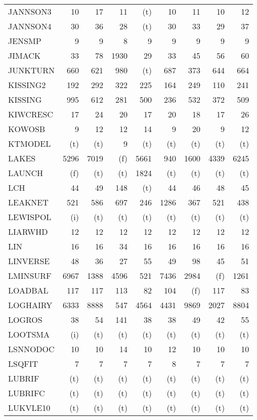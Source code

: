 \documentclass[11pt,twoside]{article}
\begin{document}
{\begin{longtable}[c]{|l|r|r|r|r|r|r|r|r|}
 JANNSON3 & 10 & 17 & 11 & (t) & 10 & 11 & 10 & 12 \\
 JANNSON4 & 30 & 36 & 28 & (t) & 30 & 33 & 29 & 37 \\
 JENSMP & 9 & 9 & 8 & 9 & 9 & 9 & 9 & 9 \\
 JIMACK & 33 & 78 & 1930 & 29 & 33 & 45 & 56 & 60 \\
 JUNKTURN & 660 & 621 & 980 & (t) & 687 & 373 & 644 & 664 \\
 KISSING2 & 192 & 292 & 322 & 225 & 164 & 249 & 110 & 241 \\
 KISSING & 995 & 612 & 281 & 500 & 236 & 532 & 372 & 509 \\
 KIWCRESC & 17 & 24 & 20 & 17 & 20 & 18 & 17 & 26 \\
 KOWOSB & 9 & 12 & 12 & 14 & 9 & 20 & 9 & 12 \\
 KTMODEL & (t) & (t) & 9 & (t) & (t) & (t) & (t) & (t) \\
 LAKES & 5296 & 7019 & (f) & 5661 & 940 & 1600 & 4339 & 6245 \\
 LAUNCH & (f) & (t) & (t) & 1824 & (t) & (t) & (t) & (t) \\
 LCH & 44 & 49 & 148 & (t) & 44 & 46 & 48 & 45 \\
 LEAKNET & 521 & 586 & 697 & 246 & 1286 & 367 & 521 & 438 \\
 LEWISPOL & (i) & (t) & (t) & (t) & (t) & (t) & (t) & (t) \\
 LIARWHD & 12 & 12 & 12 & 12 & 12 & 12 & 12 & 12 \\
 LIN & 16 & 16 & 34 & 16 & 16 & 16 & 16 & 16 \\
 LINVERSE & 48 & 36 & 27 & 55 & 49 & 98 & 45 & 51 \\
 LMINSURF & 6967 & 1388 & 4596 & 521 & 7436 & 2984 & (f) & 1261 \\
 LOADBAL & 117 & 117 & 113 & 82 & 104 & (f) & 117 & 83 \\
 LOGHAIRY & 6333 & 8888 & 547 & 4564 & 4431 & 9869 & 2027 & 8804 \\
 LOGROS & 38 & 54 & 141 & 38 & 38 & 49 & 42 & 55 \\
 LOOTSMA & (i) & (t) & (t) & (t) & (t) & (t) & (t) & (t) \\
 LSNNODOC & 10 & 10 & 14 & 10 & 12 & 10 & 10 & 10 \\
 LSQFIT & 7 & 7 & 7 & 7 & 8 & 7 & 7 & 7 \\
 LUBRIF & (t) & (t) & (t) & (t) & (t) & (t) & (t) & (t) \\
 LUBRIFC & (t) & (t) & (t) & (t) & (t) & (t) & (t) & (t) \\
 LUKVLE10 & (t) & (t) & (t) & (t) & (t) & (t) & (t) & (t) \\

\end{longtable}}
\end{document}
